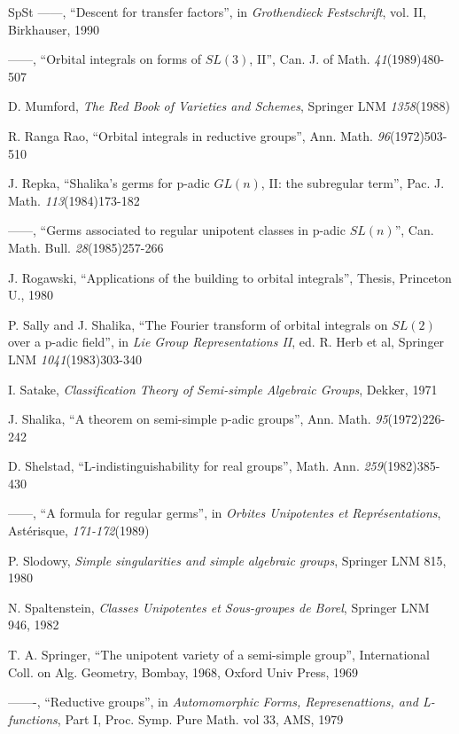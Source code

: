 \documentclass[12pt,letterpaper]{amsart}
\begin{document}
\begin{thebibliography}{SpSt}
 ------, ``Descent for transfer factors'', in
\textit{Grothendieck Festschrift}, vol. II,
Birkhauser, 1990

 ------, ``Orbital integrals on forms of
$SL(3)$, II'', Can. J. of Math. \textit{41}(1989)480-507

 D. Mumford,
\textit{The Red Book of Varieties and Schemes}, Springer LNM
\textit{1358}(1988)

 R. Ranga Rao, ``Orbital integrals in reductive groups'',
Ann. Math. \textit{96}(1972)503-510

 J. Repka, ``Shalika's germs for p-adic $GL(n)$, II:
the subregular term'', Pac. J. Math. \textit{113}(1984)173-182

 ------, ``Germs associated to regular unipotent
classes in p-adic $SL(n)$'', Can. Math. Bull. \textit{28}(1985)257-266

 J. Rogawski, ``Applications of the building to orbital
integrals'', Thesis, Princeton U., 1980

 P. Sally and J. Shalika, ``The Fourier transform of orbital
integrals on $SL(2)$ over a p-adic field'', in
\textit{Lie Group Representations II},
ed. R. Herb et al, Springer LNM \textit{1041}(1983)303-340

 I. Satake, \textit{Classification Theory
of Semi-simple Algebraic Groups}, Dekker, 1971

 J. Shalika, ``A theorem on semi-simple p-adic groups'',
Ann. Math. \textit{95}(1972)226-242

 D. Shelstad, ``L-indistinguishability for real
groups'', Math. Ann. \textit{259}(1982)385-430

 ------, ``A formula for regular germs'',
in \textit{Orbites Unipotentes et Repr\'esentations},
Ast\'erisque, \textit{171-172}(1989)

 P. Slodowy, \textit{Simple singularities
and simple algebraic groups}, Springer LNM 815, 1980

 N. Spaltenstein, \textit{Classes
Unipotentes et Sous-groupes de Borel},
Springer LNM 946, 1982

 T. A. Springer, ``The unipotent variety of a semi-simple
group'', International Coll. on Alg. Geometry, Bombay, 1968,
Oxford Univ Press, 1969

 -------, ``Reductive groups'', in
\textit{Automomorphic Forms, Represenattions, and L-functions},
Part I, Proc. Symp. Pure Math. vol 33,
AMS, 1979


\end{thebibliography}
\end{document}
